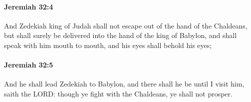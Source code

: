 		\paragraph{Jeremiah 32:4} %
			\label{JEREMIAH-32-4}

			And Zedekiah king of Judah shall not escape out of the hand of the Chaldeans, but shall surely be delivered into the hand of the king of Babylon, and shall speak with him mouth to mouth, and his eyes shall behold his eyes;


		\paragraph{Jeremiah 32:5} %
			\label{JEREMIAH-32-5}

			And he shall lead Zedekiah to Babylon, and there shall he be until I visit him, saith the LORD: though ye fight with the Chaldeans, ye shall not prosper.

